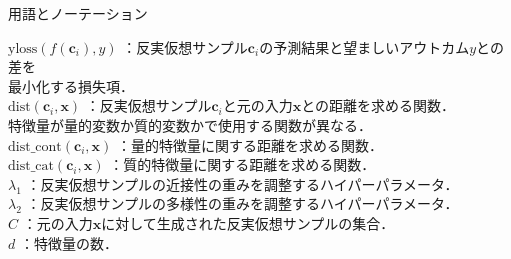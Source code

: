\documentclass[dvipdfmx]{jreport}
\begin{document}
\begin{itembox}[l]{\large{用語とノーテーション}}
\begin{tabbing}
        \hspace{15pt} \raisebox{0.5ex}{\tiny $\bullet$} $\text{yloss}(f(\bm{c}_i), y)$ \>：反実仮想サンプル$\bm{c}_i$の予測結果と望ましいアウトカム$y$との差を\\[0.5em]\>\hspace{6.5pt}最小化する損失項．\\[0.5em]
        \hspace{15pt} \raisebox{0.5ex}{\tiny $\bullet$} $\text{dist}(\bm{c}_i, \bm{x})$ \>：反実仮想サンプル$\bm{c}_i$と元の入力$\bm{x}$との距離を求める関数．\\[0.5em]\>\hspace{6.5pt}特徴量が量的変数か質的変数かで使用する関数が異なる．\\[0.5em]
        \hspace{15pt} \raisebox{0.5ex}{\tiny $\bullet$} $\text{dist\_cont}(\bm{c}_i, \bm{x})$ \>：量的特徴量に関する距離を求める関数．\\[0.5em]
        \hspace{15pt} \raisebox{0.5ex}{\tiny $\bullet$} $\text{dist\_cat}(\bm{c}_i, \bm{x})$ \>：質的特徴量に関する距離を求める関数．\\[0.5em] 
        \hspace{15pt} \raisebox{0.5ex}{\tiny $\bullet$} $\lambda_1$ \>：反実仮想サンプルの近接性の重みを調整するハイパーパラメータ．\\[0.5em]
        \hspace{15pt} \raisebox{0.5ex}{\tiny $\bullet$} $\lambda_2$ \>：反実仮想サンプルの多様性の重みを調整するハイパーパラメータ．\\[0.5em]
        \hspace{15pt} \raisebox{0.5ex}{\tiny $\bullet$} $C$ \>：元の入力$\bm{x}$に対して生成された反実仮想サンプルの集合．\\[0.5em]
        \hspace{15pt} \raisebox{0.5ex}{\tiny $\bullet$} $d$ \>：特徴量の数．
    \end{tabbing}
\end{itembox}

\end{document}
